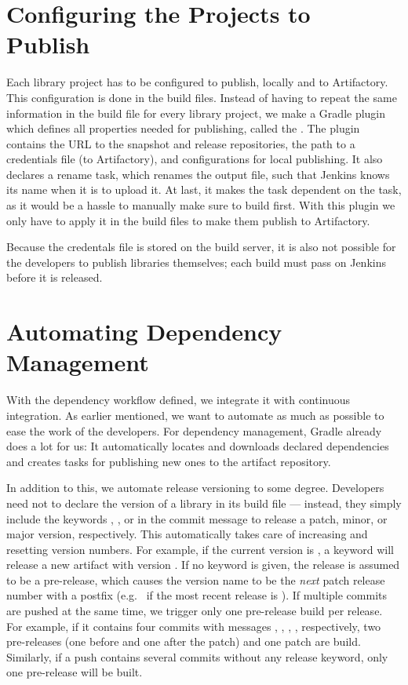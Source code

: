 \section{Configuring the Projects to Publish}\label{sec:conf_project_to_publish}
Each library project has to be configured to publish, locally and to Artifactory. This configuration is done in the build files. Instead of having to repeat the same information in the build file for every library project, we make a Gradle plugin which defines all properties needed for publishing, called the . The plugin contains the URL to the snapshot and release repositories, the path to a credentials file (to Artifactory), and configurations for local publishing. It also declares a rename task, which renames the output file, such that Jenkins knows its name when it is to upload it. At last, it makes the  task dependent on the  task, as it would be a hassle to manually make sure to build first. With this plugin we only have to apply it in the build files to make them publish to Artifactory.

Because the credentals file is stored on the build server, it is also not possible for the developers to publish libraries themselves; each build must pass on Jenkins before it is released.

\section{Automating Dependency Management}\label{sec:automating_vm}
With the dependency workflow defined, we integrate it with continuous integration. As earlier mentioned, we want to automate as much as possible to ease the work of the developers. For dependency management, Gradle already does a lot for us: It automatically locates and downloads declared dependencies and creates tasks for publishing new ones to the artifact repository.

In addition to this, we automate release versioning to some degree. Developers need not to declare the version of a library in its build file --- instead, they simply include the keywords , , or  in the commit message to release a patch, minor, or major version, respectively. This automatically takes care of increasing and resetting version numbers. For example, if the current version is , a  keyword will release a new artifact with version . If no keyword is given, the release is assumed to be a pre-release, which causes the version name to be the \emph{next} patch release number with a  postfix (e.g.\  if the most recent release is ). If multiple commits are pushed at the same time, we trigger only one pre-release build per release. For example, if it contains four commits with messages , , , , respectively, two pre-releases (one before and one after the patch) and one patch are build. Similarly, if a push contains several commits without any release keyword, only one pre-release will be built. 

